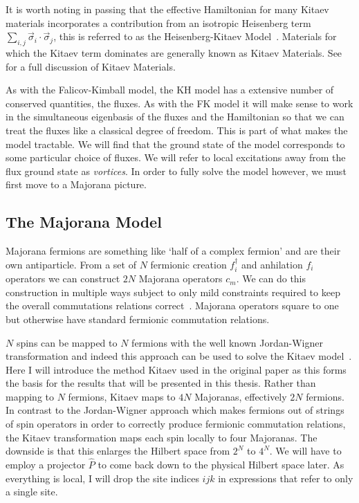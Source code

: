 It is worth noting in passing that the effective Hamiltonian for many Kitaev materials incorporates a contribution from an isotropic Heisenberg term \(\sum_{i,j} \vec{\sigma}_i\cdot\vec{\sigma}_j\), this is referred to as the Heisenberg-Kitaev Model~\autocite{Chaloupka2010}. Materials for which the Kitaev term dominates are generally known as Kitaev Materials. See~\autocite{TrebstPhysRep2022} for a full discussion of Kitaev Materials.

As with the Falicov-Kimball model, the KH model has a extensive number of conserved quantities, the fluxes. As with the FK model it will make sense to work in the simultaneous eigenbasis of the fluxes and the Hamiltonian so that we can treat the fluxes like a classical degree of freedom. This is part of what makes the model tractable. We will find that the ground state of the model corresponds to some particular choice of fluxes. We will refer to local excitations away from the flux ground state as \emph{vortices}. In order to fully solve the model however, we must first move to a Majorana picture.

\hypertarget{the-majorana-model}{%
\subsection{The Majorana Model}\label{the-majorana-model}}

Majorana fermions are something like `half of a complex fermion' and are their own antiparticle. From a set of \(N\) fermionic creation \(f_i^\dagger\) and anhilation \(f_i\) operators we can construct \(2N\) Majorana operators \(c_m\). We can do this construction in multiple ways subject to only mild constraints required to keep the overall commutations relations correct~\autocite{kitaevAnyonsExactlySolved2006}. Majorana operators square to one but otherwise have standard fermionic commutation relations.

\(N\) spins can be mapped to \(N\) fermions with the well known Jordan-Wigner transformation and indeed this approach can be used to solve the Kitaev model~\autocite{chenExactResultsKitaev2008}. Here I will introduce the method Kitaev used in the original paper as this forms the basis for the results that will be presented in this thesis. Rather than mapping to \(N\) fermions, Kitaev maps to \(4N\) Majoranas, effectively \(2N\) fermions. In contrast to the Jordan-Wigner approach which makes fermions out of strings of spin operators in order to correctly produce fermionic commutation relations, the Kitaev transformation maps each spin locally to four Majoranas. The downside is that this enlarges the Hilbert space from \(2^N\) to \(4^N\). We will have to employ a projector \(\hat{P}\) to come back down to the physical Hilbert space later. As everything is local, I will drop the site indices \(ijk\) in expressions that refer to only a single site.

